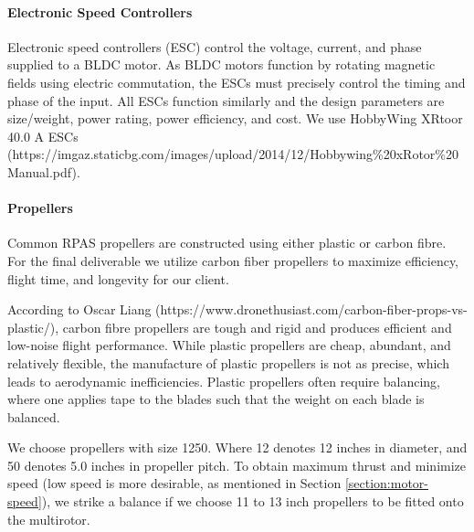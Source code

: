 \paragraph{Electronic Speed Controllers}

Electronic speed controllers (ESC) control the voltage, current, and phase supplied to a BLDC motor. As BLDC motors function by rotating magnetic fields using electric commutation, the ESCs must precisely control the timing and phase of the input. All ESCs function similarly and the design parameters are size/weight, power rating, power efficiency, and cost. We use HobbyWing XRtoor 40.0 A  ESCs (https://imgaz.staticbg.com/images/upload/2014/12/Hobbywing\%20xRotor\%20Manual.pdf).

\paragraph{Propellers}

Common RPAS propellers are constructed using either plastic or carbon fibre. For the final deliverable we utilize carbon fiber propellers to maximize efficiency, flight time, and longevity for our client. 

According to Oscar Liang (https://www.dronethusiast.com/carbon-fiber-props-vs-plastic/),  carbon fibre propellers are tough and rigid and produces efficient and low-noise flight performance.  While plastic propellers are cheap, abundant, and relatively flexible, the manufacture of plastic propellers is not as precise, which leads to aerodynamic inefficiencies. Plastic propellers often require balancing, where one applies tape to the blades such that the weight on each blade is balanced. 

We choose propellers with size 1250. Where 12 denotes 12 inches in diameter, and 50 denotes 5.0 inches in propeller pitch. To obtain maximum thrust and minimize speed (low speed is more desirable, as mentioned in Section \ref{section:motor-speed}), we strike a balance if we choose 11 to 13 inch propellers to be fitted onto the multirotor.

